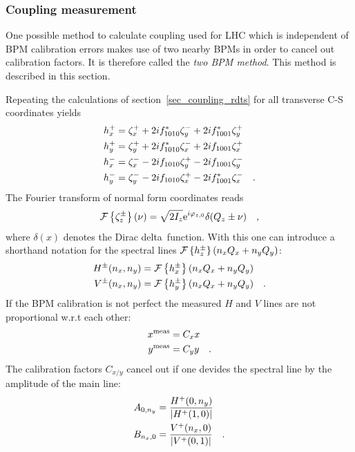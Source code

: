 \subsubsection{Coupling measurement}

One possible method to calculate coupling used for LHC which is independent of BPM calibration errors
makes use of two nearby BPMs in order to cancel out calibration factors. It is therefore called
the \emph{two BPM method}. This method is described in this section.

Repeating the calculations of section~\ref{sec_coupling_rdts} for all transverse C-S coordinates yields
%
\begin{align}
    h_x^+ &= \zeta_x^+ + 2if_{1010}^* \zeta_y^- + 2if_{1001}^*\zeta_y^+  \notag\\  
    h_y^+ &= \zeta_y^+ + 2if_{1010}^* \zeta_x^- + 2i{f_{1001}}\zeta_x^+   \notag\\ 
    h_x^- &= \zeta_x^- - 2i{f_{1010}} \zeta_y^+ - 2i{f_{1001}}\zeta_y^-   \notag\\ 
    h_y^- &= \zeta_y^- - 2i{f_{1010}} \zeta_x^+ - 2if_{1001}^*\zeta_x^-    
    \quad .
\end{align}
%
The Fourier transform of normal form coordinates reads
%
\begin{equation}
    \mathcal{F} \left\{ \zeta_z^\pm \right\}(\nu) = \sqrt{2I_z}\text{e}^{i\varphi_{z,0}} \delta(Q_z \pm \nu)
    \quad ,
\end{equation}
%
where $\delta(x)$ denotes the Dirac delta~function.
With this one can introduce a shorthand notation for the spectral lines $\mathcal{F} \left\{ h_z^\pm \right\}(n_xQ_x+n_yQ_y)$:
%
\begin{align}
    H^\pm(n_x,n_y) &= \mathcal{F} \left\{ h_x^\pm \right\}(n_xQ_x+n_yQ_y) \notag\\
    V^\pm(n_x,n_y) &= \mathcal{F} \left\{ h_y^\pm \right\}(n_xQ_x+n_yQ_y) 
    \quad .
\end{align}
%
If the BPM calibration is not perfect the measured $H$ and $V$ lines are not proportional w.r.t each other:
\newcommand{\meas}{^\text{meas}}
%
\begin{align}
   x\meas &= C_x x \notag \\ 
   y\meas &= C_y y
   \fstop
\end{align}
%
The calibration factors $C_{x/y}$ cancel out if one devides the spectral line by the amplitude of
the main line:
%
\begin{align}
    A_{0,n_y} &= \frac{H^+(0,n_y)}{\left|H^+(1,0)\right|} \notag \\
    B_{n_x,0} &= \frac{V^+(n_x,0)}{\left|V^+(0,1)\right|} 
    \quad .
\end{align}
